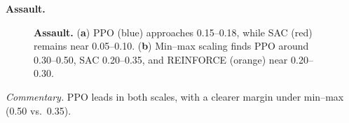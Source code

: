 \noindent \textbf{Assault.}
\begin{figure} 
	\centering
	\quad
	\caption{\textbf{Assault.}
		(\textbf{a}) PPO (blue) approaches 0.15--0.18, while SAC (red) remains near 0.05--0.10.
		(\textbf{b}) Min--max scaling finds PPO around 0.30--0.50, SAC 0.20--0.35, and REINFORCE (orange) near 0.20--0.30.}
	\label{fig:assault_combined}
\end{figure}

\noindent
\emph{Commentary.} PPO leads in both scales, with a clearer margin under min--max (0.50 vs.\ 0.35).

\medskip

